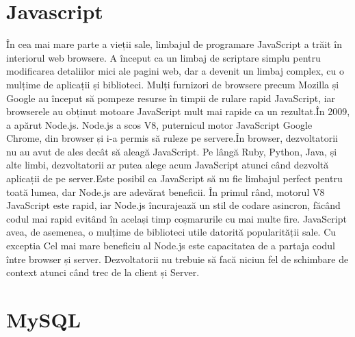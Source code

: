 \section{Javascript}
\label{sec:ch3sec2}

\par În cea mai mare parte a vieții sale, limbajul de programare JavaScript a trăit în interiorul web browsere. A început ca un limbaj de scriptare simplu pentru modificarea detaliilor mici ale pagini web, dar a devenit un limbaj complex, cu o mulțime de aplicații și biblioteci. Mulți furnizori de browsere precum Mozilla și Google au început să pompeze resurse în timpii de rulare rapid JavaScript, iar browserele au obținut motoare JavaScript mult mai rapide ca
un rezultat.În 2009, a apărut Node.js. Node.js a scos V8, puternicul motor JavaScript Google Chrome, din browser și i-a permis să ruleze pe servere.În browser, dezvoltatorii nu au avut de ales decât să aleagă JavaScript. Pe lângă Ruby, Python, Java, și alte limbi, dezvoltatorii ar putea alege acum JavaScript atunci când dezvoltă aplicații de pe server.Este posibil ca JavaScript să nu fie limbajul perfect pentru toată lumea, dar Node.js are adevărat beneficii. În primul rând, motorul V8 JavaScript este rapid, iar Node.js încurajează un stil de codare asincron, făcând codul mai rapid evitând în același timp coșmarurile cu mai multe fire. JavaScript avea, de asemenea, o mulțime de biblioteci utile datorită popularității sale. Cu exceptia Cel mai mare beneficiu al Node.js este capacitatea de a partaja codul între browser și server. Dezvoltatorii nu trebuie să facă niciun fel de schimbare de context atunci când trec de la client și Server. 

\section{MySQL}
\label{sec:ch3sec3}

